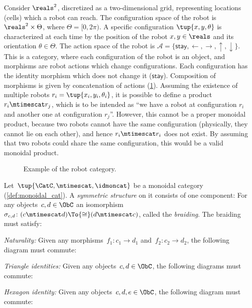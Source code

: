 \begin{example}
  \label{ex:robot}
  Consider $\reals^2$, discretized as a two-dimensional grid, representing locations (cells) which a robot can reach. The configuration space of the robot is $\reals^2\times \Theta$, where $\Theta=[0,2\pi)$. A specific configuration $\tup{x,y,\theta}$ is characterized at each time by the position of the robot $x,y\in \reals$ and its orientation $\theta \in \Theta$. The action space of the robot is $\mathcal{A}=\{\mathsf{stay},\leftarrow, \rightarrow, \uparrow, \downarrow\}$. This is a category, where each configuration of the robot is an object, and morphisms are robot actions which change configurations. Each configuration has the identity morphism which does not change it ($\mathsf{stay}$). Composition of morphisms is given by concatenation of actions (\cref{fig:robotcategory}). Assuming the existence of multiple robots $r_i=\tup{x_i,y_i,\theta_i}$, it is possible to define a product $r_i\mtimescat r_j$, which is to be intended as ``we have a robot at configuration $r_i$ and another one at configuration $r_j$''. However, this cannot be a proper monoidal product, because two robots cannot have the same configuration (physically, they cannot lie on each other), and hence $r_i\mtimescat r_i$ does not exist. By assuming that two robots could share the same configuration, this would be a valid monoidal product.
  \begin{figure}[tbh]
    \begin{center}
    \end{center}
    \caption{Example of the robot category. \label{fig:robotcategory}}
  \end{figure}
\end{example}


\begin{ctdefinition}
  Let~$\tup{\CatC,\mtimescat,\idmoncat}$ be a monoidal category (\cref{def:monoidal_cat}). A \emph{symmetric structure} on it consists of one component: For any objects~$c,d\in\ObC$ an isomorphism~$\sigma_{c,d}\colon (c\mtimescat d)\To{\cong}(d\mtimescat c)$, called the \emph{braiding}. The braiding must satisfy:
  \begin{compactenum}
    \item \emph{Naturality:} Given any morphisms~$f_1\colon c_1\to d_1$ and~$f_2\colon c_2\to d_2$, the following diagram must commute:
    \begin{center}
    \end{center}
    \item \emph{Triangle identities:} Given any objects~$c,d\in\ObC$, the following diagrams must commute:
    \begin{center}
    \end{center}
    \item \emph{Hexagon identity:} Given any objects~$c,d,e\in \ObC$, the following diagram must commute:
    \begin{center}
    \end{center}
  \end{compactenum}
\end{ctdefinition}
